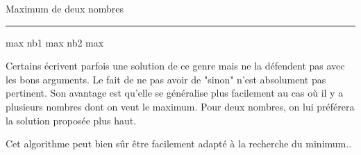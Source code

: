 \begin{Fiche}{Maximum de deux nombres}
	\hfil\rule{0.5\textwidth}{.4pt}\hfil

	\begin{minipage}{7.5cm}
		\begin{LDA}
			\Let max \Gets nb1
				\Let max \Gets nb2
			\EndIf
			\Return max
		\EndAlgo
		\end{LDA}
	\end{minipage}
	\quad
	\begin{minipage}{6cm}
		Certains écrivent parfois une solution de ce genre
		mais ne la défendent pas avec les bons arguments.
		Le fait de ne pas avoir de "sinon" n'est absolument pas pertinent.
		Son avantage est qu'elle se généralise plus facilement
		au cas où il y a plusieurs nombres dont on veut le maximum.
		Pour deux nombres, on lui préférera la solution proposée plus haut.
	\end{minipage}
	

	Cet algorithme peut bien sûr être facilement adapté
	à la recherche du minimum..
		
\end{Fiche}
